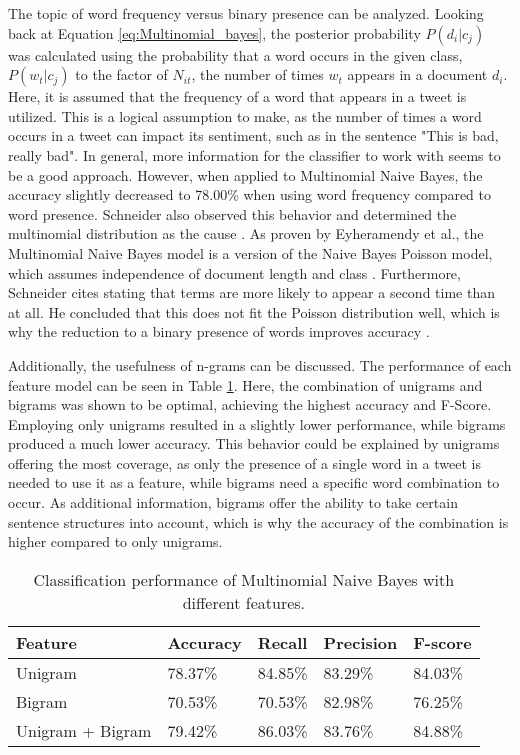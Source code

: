 The topic of word frequency versus binary presence can be analyzed. Looking back at Equation \eqref{eq:Multinomial_bayes}, the posterior probability $P(d_i|c_j)$ was calculated using the probability that a word occurs in the given class, $P(w_t|c_j)$ to the factor of $N_{it}$, the number of times $w_t$ appears in a document $d_i$. Here, it is  assumed that the frequency of a word that appears in a tweet is utilized. This is a logical assumption to make, as the number of times a word occurs in a tweet can impact its sentiment, such as in the sentence "This is bad, really bad". In general, more information for the classifier to work with seems to be a good approach. However, when applied to Multinomial Naive Bayes, the accuracy slightly decreased to 78.00\% when using word frequency compared to word presence. Schneider also observed this behavior and determined the multinomial distribution as the cause \cite{nb_freq}. As proven by Eyheramendy et al., the Multinomial Naive Bayes model is a version of the Naive Bayes Poisson model, which assumes independence of document length and class \cite{Poisson}. Furthermore, Schneider cites \cite{Poisson_words} stating that terms are more likely to appear a second time than at all. He concluded that this does not fit the Poisson distribution well, which is why the reduction to a binary presence of words improves accuracy \cite{nb_freq}.

Additionally, the usefulness of n-grams can be discussed. The performance of each feature model can be seen in Table \ref{tab:eval_features}. Here, the combination of unigrams and bigrams was shown to be optimal, achieving the highest accuracy and F-Score. Employing only unigrams resulted in a slightly lower performance, while bigrams produced a much lower accuracy. This behavior could be explained by unigrams offering the most coverage, as only the presence of a single word in a tweet is needed to use it as a feature, while bigrams need a specific word combination to occur. As additional information, bigrams offer the ability to take certain sentence structures into account, which is why the accuracy of the combination is higher compared to only unigrams.

\begin{table}
\centering
\caption{Classification performance of Multinomial Naive Bayes with different features.}
\begin{tabular}{ |p{4cm}||p{2cm}|p{2cm}|p{2cm}|p{2cm}| }
 \hline
 Feature &     Accuracy &      Recall &     Precision& F-score \\
 \hline
 Unigram & 78.37\% & 84.85\% & 83.29\% & 84.03\% \\
  \hline
 Bigram & 70.53\% & 70.53\% & 82.98\% & 76.25\% \\
 \hline
 Unigram + Bigram  & 79.42\%&        86.03\%&       83.76\%& 84.88\%\\
 \hline
\end{tabular}
\label{tab:eval_features}
\end{table}



